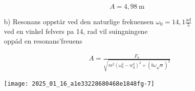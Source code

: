 \documentclass[10pt]{article}
\begin{document}
$$
A=4,98 \mathrm{~m}
$$

b) Resonans oppstär ved den naturlige frekuensen $\omega_{0}=14,1 \frac{\mathrm{ad}}{5}$\\
ved en vinkel felvers pa 14, rad vil suingningene\\
oppád en resonans'freuens

$$
\begin{aligned}
& A=\frac{F_{a}}{\sqrt{m^{2}\left(\omega_{0}^{2}-w_{d}^{2}\right)^{2}+(b \omega \sqrt{a})^{2}}}
\end{aligned}
$$

\begin{center}
\texttt{[image: 2025\_01\_16\_a1e33228680468e1848fg-7]}
\end{center}
\end{document}
